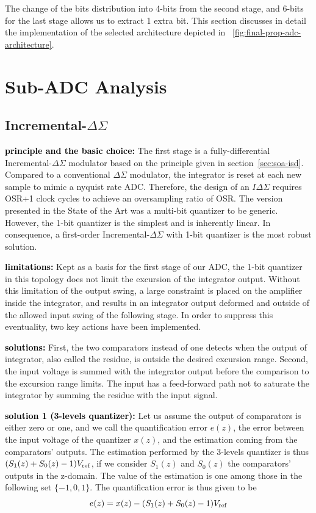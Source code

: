 The change of the bits distribution into 4-bits from the second stage, and 6-bits for the last stage allows us to extract 1 extra bit. This section discusses in detail the implementation of the selected architecture depicted in \figurename~\ref{fig:final-prop-adc-architecture}.

\section{Sub-ADC Analysis}
\subsection{Incremental-\(\Delta\Sigma \)} %

\textbf{\textcolor{black}{principle and the basic choice:}}
The first stage is a fully-differential Incremental-\(\Delta\Sigma \) modulator based on the principle given in section~\ref{sec:soa-isd}.
Compared to a conventional $\Delta\Sigma$ modulator, the integrator is reset at each new sample to mimic a nyquist rate ADC\@. Therefore, the design of an \(I\Delta\Sigma \) requires OSR+1 clock cycles to achieve an oversampling ratio of OSR\@. The version presented in the State of the Art was a multi-bit quantizer to be generic. However, the 1-bit quantizer is the simplest and is inherently linear. In consequence, a first-order Incremental-$\Delta\Sigma$ with 1-bit quantizer is the most robust solution.

\textbf{\textcolor{black}{limitations:}}
Kept as a basis for the first stage of our ADC, the 1-bit quantizer in this topology does not limit the excursion of the integrator output. Without this limitation of the output swing, a large constraint is placed on the amplifier inside the integrator, and results in an integrator output deformed and outside of the allowed input swing of the following stage. In order to suppress this eventuality, two key actions have been implemented.

\textbf{\textcolor{black}{solutions:}}
First, the two comparators instead of one detects when the output of integrator, also called the residue, is outside the desired excursion range. Second, the input voltage is summed with the integrator output before the comparison to the excursion range limits. The input has a feed-forward path not to saturate the integrator by summing the residue with the input signal.

\textbf{\textcolor{black}{solution 1 (3-levels quantizer):}}
Let us assume the output of comparators is either zero or one, and we call the quantification error $e(z)$, the error between the input voltage of the quantizer $x(z)$, and the estimation coming from the comparators' outputs. The estimation performed by the 3-levels quantizer is thus \((S_1(z)+S_0(z)-1)V_{\rm ref} \), if we consider $S_1(z)$ and $S_0(z)$ the comparators' outputs in the z-domain. The value of the estimation is one among those in the following set \(\{-1,0,1\}\). The quantification error is thus given to be
\begin{equation} 
	e(z) = x(z) - (S_1(z)+S_0(z)-1)V_{\rm ref}
\end{equation}


